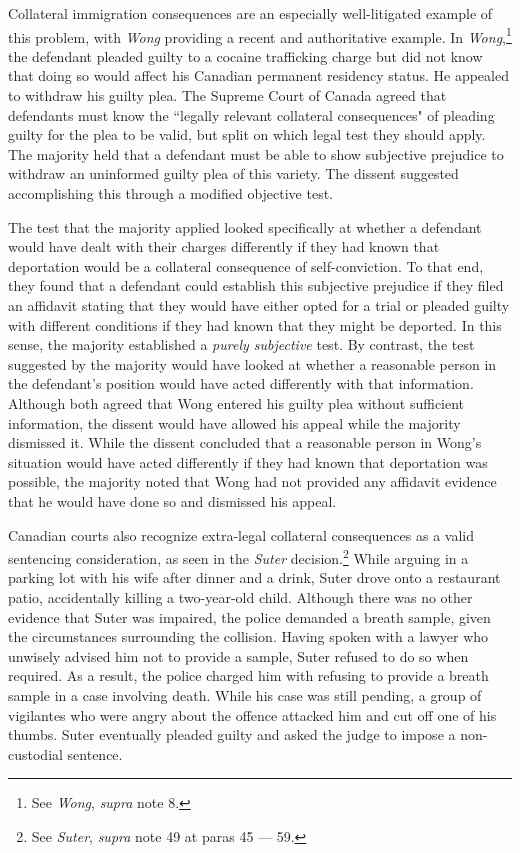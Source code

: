 Collateral immigration consequences are an especially well-litigated example of this problem, with \textit{Wong} providing a recent and authoritative example. In \textit{Wong},\footnote{See \textit{Wong}, \textit{supra} note 8.} the defendant pleaded guilty to a cocaine trafficking charge but did not know that doing so would affect his Canadian permanent residency status. He appealed to withdraw his guilty plea. The Supreme Court of Canada agreed that defendants must know the ``legally relevant collateral consequences" of pleading guilty for the plea to be valid, but split on which legal test they should apply. The majority held that a defendant must be able to show subjective prejudice to withdraw an uninformed guilty plea of this variety. The dissent suggested accomplishing this through a modified objective test. 

The test that the majority applied looked specifically at whether a defendant would have dealt with their charges differently if they had known that deportation would be a collateral consequence of self-conviction. To that end, they found that a defendant could establish this subjective prejudice if they filed an affidavit stating that they would have either opted for a trial or pleaded guilty with different conditions if they had known that they might be deported. In this sense, the majority established a \textit{purely subjective} test. By contrast, the test suggested by the majority would have looked at whether a reasonable person in the defendant's position would have acted differently with that information. Although both agreed that Wong entered his guilty plea without sufficient information, the dissent would have allowed his appeal while the majority dismissed it. While the dissent concluded that a reasonable person in Wong's situation would have acted differently if they had known that deportation was possible, the majority noted that Wong had not provided any affidavit evidence that he would have done so and dismissed his appeal.

Canadian courts also recognize extra-legal collateral consequences as a valid sentencing consideration, as seen in the \textit{Suter} decision.\footnote{See \textit{Suter}, \textit{supra} note 49 at paras 45 — 59.} While arguing in a parking lot with his wife after dinner and a drink, Suter drove onto a restaurant patio, accidentally killing a two-year-old child. Although there was no other evidence that Suter was impaired, the police demanded a breath sample, given the circumstances surrounding the collision. Having spoken with a lawyer who unwisely advised him not to provide a sample, Suter refused to do so when required. As a result, the police charged him with refusing to provide a breath sample in a case involving death. While his case was still pending, a group of vigilantes who were angry about the offence attacked him and cut off one of his thumbs. Suter eventually pleaded guilty and asked the judge to impose a non-custodial sentence.

